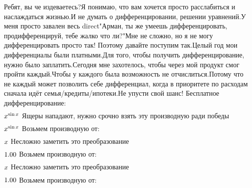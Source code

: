 Ребят, вы че издеваетесь?Я понимаю, что вам хочется просто расслабиться и наслаждаться жизнью.И не думать о дифференцировании, решении уравнений.У меня просто завален весь direct"Арман, ты же умеешь дифференцировать, продифференцируй, тебе жалко что ли?"Мне не сложно, но я не могу дифференцировать просто так! Поэтому давайте поступим так.Целый год мои дифференциалы были платными.Для того, чтобы получить дифференцирование, нужно было заплатить.Сегодня мне захотелось, чтобы через мой продукт смог пройти каждый.Чтобы у каждого была возможность не отчислиться.Потому что не каждый может позволить себе дифференциал, когда в приоритете по расходам сначала идёт семья/кредиты/ипотеки.Не упусти свой шанс! Бесплатное дифференцирование: 
\begin{gather}
\end{gather}
\begin{math}
x ^ {\sin x }\\
\end{math}
Ящеры нападают, нужно срочно взять эту производную ради победы
\begin{gather}
\end{gather}
\begin{math}
x ^ {\sin x }\\
\end{math}
Возьмем производную от: 
\begin{gather}
\end{gather}
\begin{math}
x \\
\end{math}
Несложно заметить это преобразование
\begin{gather}
\end{gather}
\begin{math}
1.00 \\
\end{math}
Возьмем производную от: 
\begin{gather}
\end{gather}
\begin{math}
x \\
\end{math}
Несложно заметить это преобразование
\begin{gather}
\end{gather}
\begin{math}
1.00 \\
\end{math}
Возьмем производную от: 
\begin{gather}
\end{gather}
